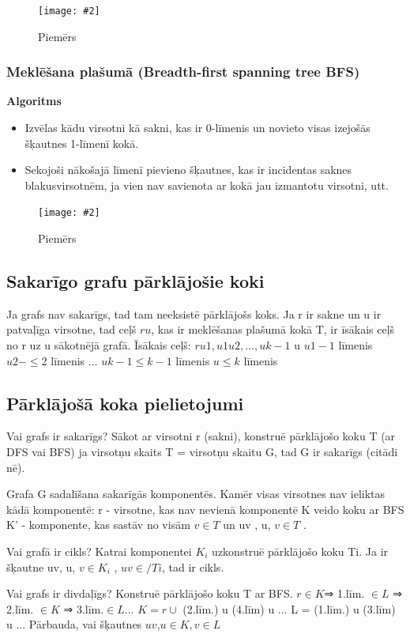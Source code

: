 \documentclass{article}
\newcommand{\illustration}[3]{
	\begin{figure}[H]
		\centering	
		\texttt{[image: \#2]}
		\caption{#3}
	\end{figure}
}
\begin{document}
\illustration{1}{dfs-1}{Piemērs}

\subsubsection{Meklēšana plašumā (Breadth-first spanning tree BFS)}

\textbf{Algoritms}
\begin{itemize}
	\item Izvēlas kādu virsotni kā sakni, kas ir 0-līmenis un novieto visas izejošās šķautnes 1-līmenī kokā.
	\item Sekojoši nākošajā līmenī pievieno šķautnes, kas ir incidentas saknes blakusvirsotnēm, ja vien nav savienota ar kokā jau izmantotu virsotni, utt.
\end{itemize}

\illustration{1}{bfs-1}{Piemērs}

\subsection{Sakarīgo grafu pārklājošie koki}

Ja grafs nav sakarīgs, tad tam neeksistē pārklājošs koks.
Ja r ir sakne un u ir patvaļīga virsotne, tad ceļš $ru$, kas ir meklēšanas plašumā kokā T, ir īsākais ceļš no r uz u sākotnējā grafā.
Īsākais ceļš: $ru1 , u1 u2 , ..., uk −1$ u
$u1 - 1$ līmenis
$u2 − \le 2$ līmenis
$...$
$uk −1 \le k-1$ līmenis
$u \le k$ līmenis

\subsection{Pārklājošā koka pielietojumi}

Vai grafs ir sakarīgs? Sākot ar virsotni r (sakni), konstruē pārklājošo koku T (ar DFS vai BFS) ja virsotņu skaits T = virsotņu skaitu G, tad G ir sakarīgs (citādi nē).

Grafa G sadalīšana sakarīgās komponentēs. Kamēr visas virsotnes nav ieliktas kādā komponentē: r - virsotne, kas nav nevienā komponentē K veido koku ar BFS K' - komponente, kas sastāv no visām $v \in T$ un uv , u, $v \in T$ .

Vai grafā ir cikls?  Katrai komponentei $K_i$ uzkonstruē pārklājošo koku Ti. Ja ir šķautne uv, u, $v \in K_i$ , $uv \in / Ti$, tad ir cikls.

Vai grafs ir divdaļīgs?  Konstruē pārklājošo koku T ar BFS.
$r \in K $⇒ 1.līm. $\in L$ ⇒ 2.līm. $\in K$ ⇒ 3.līm.$ \in L$...
$K = r \cup $ (2.līm.) u (4.līm) u ...
L = (1.līm.) u (3.līm) u ...
Pārbauda, vai šķautnes $uv$,$u \in K , v \in L$ 
\end{document}

